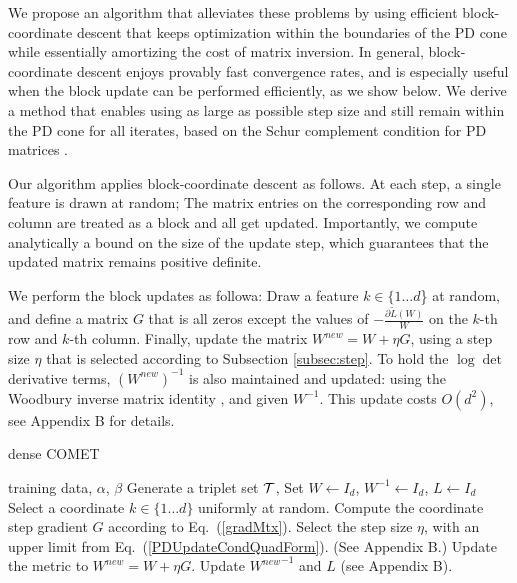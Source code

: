 \documentclass[twoside,11pt]{article}
\newcommand\mat[1]{{#1}}
\newcommand{\T}{{}^\mathsf{T}}
\newcommand{\W}{\mat{W}}
\newcommand{\newW}{{\mat{W^{new}}}}
\newcommand{\tL}{\tilde{L}(\W)}
\newcommand{\cholL}{\mat{L}}
\newcommand{\grd}{\frac{\partial \tL}{\W}}
\renewcommand{\eqref}[1]{Eq.~(\ref{#1})}
\begin{document}
We propose an algorithm that alleviates these problems by using efficient block-coordinate descent that keeps optimization within the boundaries of the PD cone while essentially amortizing the cost of matrix inversion.
In general, block-coordinate descent enjoys provably fast convergence rates, and is especially useful when the block update can be performed efficiently, as we show below. We derive a method that enables using as large as possible step size and still remain within the PD cone for all iterates, based on the Schur complement condition for PD matrices \citep[p. 650]{boyd2004convex}.

Our algorithm applies block-coordinate descent as follows. At each step, a single feature is drawn at random; The matrix entries on the corresponding row and column are treated as a block and all get updated. Importantly, we compute analytically a bound on the size of the update step, which guarantees that the updated matrix remains positive definite. %

We perform the block updates as followa: %
Draw a feature $k \in \{1 \ldots d$\} at random, and define a matrix $\mat{G}$ that is all zeros except the values of $-\grd$ on the $k$-th row and $k$-th column. Finally, update the matrix $\newW = \W +\eta \mat{G}$, using a step size $\eta$ that is selected according to Subsection \ref{subsec:step}.
To hold the $\log\det$ derivative terms, $(\newW)^{-1}$ is also maintained and updated: using the Woodbury inverse matrix identity \citep{woodbury1950inverting}, and given $\W^{-1}$. This update costs $O(d^2)$, see Appendix B for details.

\begin{algorithm}[th]
   \caption{dense COMET}
   \label{alg:comet}
\begin{algorithmic}[1]
    training data, $\alpha$, $\beta$
   \STATE Generate a triplet set $\cal{T}$, Set  $\W  \leftarrow I_d$, $\W^{-1}  \leftarrow I_d$, $\cholL  \leftarrow I_d$
   \REPEAT 
   \STATE Select a coordinate $k \in \{1 \ldots d\}$ uniformly at random.
   \STATE Compute the coordinate step gradient $\mat{G}$ according to \eqref{gradMtx}.
   \STATE Select the step size $\eta$, with an upper limit from \eqref{PDUpdateCondQuadForm}. (See Appendix B.)
   \STATE Update the metric to $\newW=\W+\eta G$.
   \STATE Update $\newW^{-1}$ and $\cholL$ (see Appendix B).
\end{algorithmic}
\end{algorithm}
\end{document}
